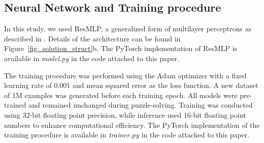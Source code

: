 
\subsection{\label{sec_train_procedure}Neural Network and Training procedure}

In this study, we used ResMLP, a generalized form of multilayer perceptrons as described in \cite{agostinelli2019solving,takano2023selfsupervision}. 
Details of the architecture can be found in Figure~\ref{fig_solution_struct}b.
The PyTorch implementation of ResMLP is available in \textit{model.py} in the code attached to this paper.

The training procedure was performed using the Adam optimizer with a fixed learning rate of 0.001 and mean squared error as the loss function. 
A new dataset of 1M examples was generated before each training epoch. 
All models were pre-trained and remained unchanged during puzzle-solving. 
Training was conducted using 32-bit floating point precision, while inference used 16-bit floating point numbers to enhance computational efficiency. 
The PyTorch implementation of the training procedure is available in \textit{trainer.py} in the code attached to this paper.